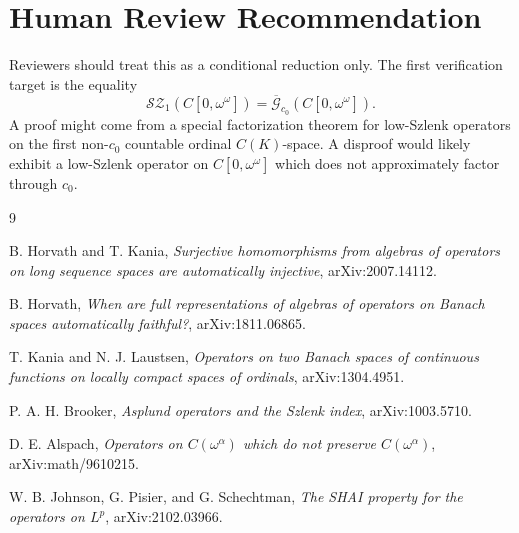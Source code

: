 \documentclass[11pt]{article}
\newcommand{\G}{\mathscr{G}}
\newcommand{\SZ}{\mathscr{S\!Z}}
\begin{document}
\section*{Human Review Recommendation}

Reviewers should treat this as a conditional reduction only.  The first
verification target is the equality
\[
\SZ_1(C[0,\omega^\omega])=\overline{\G}_{c_0}(C[0,\omega^\omega]).
\]
A proof might come from a special factorization theorem for low-Szlenk
operators on the first non-\(c_0\) countable ordinal \(C(K)\)-space.  A
disproof would likely exhibit a low-Szlenk operator on \(C[0,\omega^\omega]\)
which does not approximately factor through \(c_0\).

\begin{thebibliography}{9}

B. Horvath and T. Kania,
\emph{Surjective homomorphisms from algebras of operators on long sequence
spaces are automatically injective},
arXiv:2007.14112.

B. Horvath,
\emph{When are full representations of algebras of operators on Banach
spaces automatically faithful?},
arXiv:1811.06865.

T. Kania and N. J. Laustsen,
\emph{Operators on two Banach spaces of continuous functions on locally
compact spaces of ordinals},
arXiv:1304.4951.

P. A. H. Brooker,
\emph{Asplund operators and the Szlenk index},
arXiv:1003.5710.

D. E. Alspach,
\emph{Operators on \(C(\omega^\alpha)\) which do not preserve
\(C(\omega^\alpha)\)},
arXiv:math/9610215.

W. B. Johnson, G. Pisier, and G. Schechtman,
\emph{The SHAI property for the operators on \(L^p\)},
arXiv:2102.03966.

\end{thebibliography}
\end{document}
